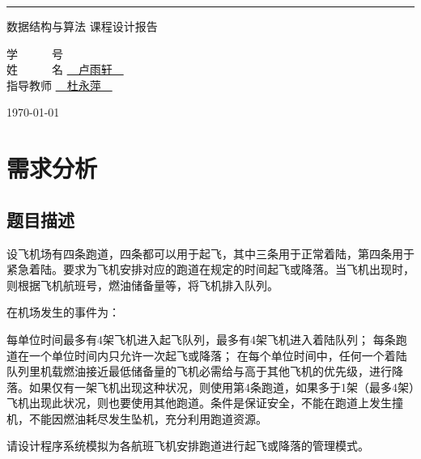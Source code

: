 \documentclass{ctexart}
\begin{document}
\begin{titlepage}
    \centering
    \rule{\textwidth}{0pt}
    \vspace{0.3\textheight}
    
    { \heiti 数据结构与算法 课程设计报告}
    
    \vspace{0.2\textheight}
    {
        \selectfont \songti
        学~~~~~~号 \underline{\qquad{}\;\qquad} \\
        姓~~~~~~名 \underline{\qquad~~卢雨轩~~\qquad} \\ 
        指导教师   \underline{\qquad~~杜永萍~~\qquad} \\
    }
    \vfill
    
    { \songti \today}
    
    \vspace{0.25\textheight}
\end{titlepage}

\tableofcontents
\clearpage

\section{需求分析}
\subsection{题目描述}

设飞机场有四条跑道，四条都可以用于起飞，其中三条用于正常着陆，第四条用于紧急着陆。要求为飞机安排对应的跑道在规定的时间起飞或降落。当飞机出现时，则根据飞机航班号，燃油储备量等，将飞机排入队列。

在机场发生的事件为：

\begin{outline}[enumerate]
\1 每单位时间最多有4架飞机进入起飞队列，最多有4架飞机进入着陆队列；
\1 每条跑道在一个单位时间内只允许一次起飞或降落；
\1 在每个单位时间中，任何一个着陆队列里机载燃油接近最低储备量的飞机必需给与高于其他飞机的优先级，进行降落。如果仅有一架飞机出现这种状况，则使用第4条跑道，如果多于1架（最多4架）飞机出现此状况，则也要使用其他跑道。条件是保证安全，不能在跑道上发生撞机，不能因燃油耗尽发生坠机，充分利用跑道资源。
\end{outline}

请设计程序系统模拟为各航班飞机安排跑道进行起飞或降落的管理模式。
\end{document}
